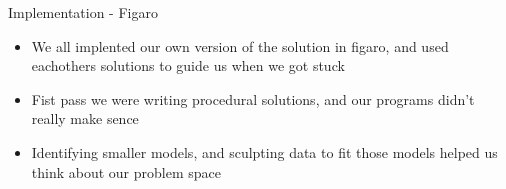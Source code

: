 \documentclass[11pt]{beamer}
\begin{document}
\begin{frame}{Implementation - Figaro}
\begin{multicols}{2}
\resizebox{!}{1.5in}{
}
\columnbreak

\begin{itemize}
\item We all implented our own version of the solution in figaro, and used eachothers solutions to guide us when we got stuck
\item Fist pass we were writing procedural solutions, and our programs didn't really make sence
\item Identifying smaller models, and sculpting data to fit those models helped us think about our problem space
\end{itemize}
\end{multicols}

\end{frame}
\end{document}
